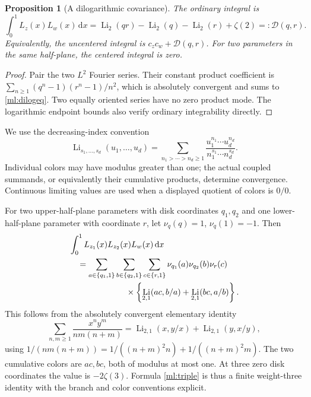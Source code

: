 \documentclass[11pt]{article}
\numberwithin{equation}{section}
\theoremstyle{plain}
\newtheorem{proposition}[theorem]{Proposition}
\theoremstyle{definition}
\theoremstyle{remark}
\DeclareMathOperator{\Li}{Li}
\newcommand{\dd}{\,\mathrm d}
\begin{document}
\begin{proposition}[A dilogarithmic covariance]
\label{ml:dilog}
The ordinary integral is
\begin{equation}\label{ml:dilogeq}
 \int_0^1L_z(x)L_w(x)\dd x
       =\Li_2(qr)-\Li_2(q)-\Li_2(r)+\zeta(2)=:\mathcal D(q,r).
\end{equation}
Equivalently, the uncentered integral is $c_zc_w+\mathcal D(q,r)$.
For two parameters in the same half-plane, the centered integral is zero.
\end{proposition}
\begin{proof}
Pair the two $L^2$ Fourier series. Their constant product coefficient
is $\sum_{n\ge1}(q^n-1)(r^n-1)/n^2$, which is absolutely
convergent and sums to \eqref{ml:dilogeq}. Two equally oriented
series have no zero product mode. The logarithmic endpoint bounds
also verify ordinary integrability directly.
\end{proof}

We use the decreasing-index convention
\begin{equation}\label{ml:MPL}
 \Li_{s_1,\ldots,s_d}(u_1,\ldots,u_d)
 =\sum_{n_1>\cdots>n_d\ge1}
       \frac{u_1^{n_1}\cdots u_d^{n_d}}
            {n_1^{s_1}\cdots n_d^{s_d}}.
\end{equation}
Individual colors may have modulus greater than one; the actual coupled
summands, or equivalently their cumulative products, determine
convergence. Continuous limiting values are used when a displayed
quotient of colors is $0/0$.

For two upper-half-plane parameters with disk coordinates $q_1,q_2$
and one lower-half-plane parameter with coordinate $r$, let
$\nu_q(q)=1$, $\nu_q(1)=-1$. Then
\begin{align}
 &\int_0^1L_{z_1}(x)L_{z_2}(x)L_w(x)\dd x\notag\\
 &\quad=\sum_{a\in\{q_1,1\}}
        \sum_{b\in\{q_2,1\}}
        \sum_{c\in\{r,1\}}
        \nu_{q_1}(a)\nu_{q_2}(b)\nu_r(c)\notag\\
 &\hspace{24mm}\times
       \left\{\Li_{2,1}(ac,b/a)+\Li_{2,1}(bc,a/b)\right\}.
       \label{ml:triple}
\end{align}
This follows from the absolutely convergent elementary identity
\[
 \sum_{n,m\ge1}\frac{x^ny^m}{nm(n+m)}
     =\Li_{2,1}(x,y/x)+\Li_{2,1}(y,x/y),
\]
using $1/(nm(n+m))=1/((n+m)^2n)+1/((n+m)^2m)$.
The two cumulative colors are $ac,bc$, both of modulus at most one.
At three zero disk coordinates the value is $-2\zeta(3)$.
Formula \eqref{ml:triple} is thus a finite weight-three identity with
the branch and color conventions explicit.
\end{document}
